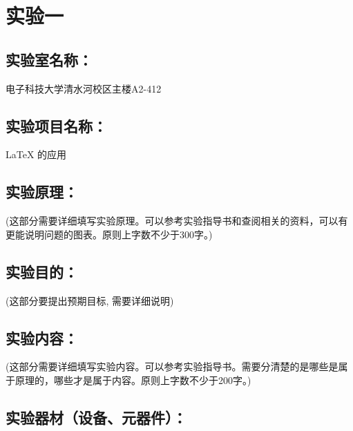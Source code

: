 \documentclass[a4paper,11pt,UTF8,AutoFakeBold]{ctexart}
\begin{document}
\xiaosihao\kaishu

\author{XXX}

\maketitle

\chapter{实验一} %

\section{实验室名称：}
电子科技大学清水河校区主楼A2-412

\section{实验项目名称：}
LaTeX 的应用

\section{实验原理：}

(这部分需要详细填写实验原理。可以参考实验指导书和查阅相关的资料，可以有更能说明问题的图表。原则上字数不少于300字。)\\


\section{实验目的：}

(这部分要提出预期目标, 需要详细说明)\\

\section{实验内容：}

(这部分需要详细填写实验内容。可以参考实验指导书。需要分清楚的是哪些是属于原理的，哪些才是属于内容。原则上字数不少于200字。)\\

\section{实验器材（设备、元器件）：}
\end{document}
